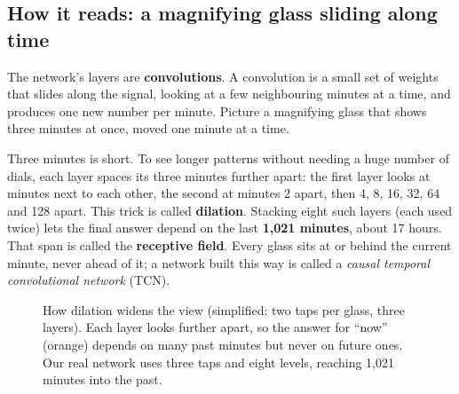 \subsection{How it reads: a magnifying glass sliding along time}
The network's layers are \textbf{convolutions}. A convolution is a small set of weights that slides along the
signal, looking at a few neighbouring minutes at a time, and produces one new number per minute. Picture a magnifying
glass that shows three minutes at once, moved one minute at a time.

Three minutes is short. To see longer patterns without needing a huge number of dials, each layer spaces its three
minutes further apart: the first layer looks at minutes next to each other, the second at minutes 2 apart, then 4, 8,
16, 32, 64 and 128 apart. This trick is called \textbf{dilation}. Stacking eight such layers (each used twice) lets the
final answer depend on the last \textbf{1{,}021 minutes}, about 17 hours. That span is called the
\textbf{receptive field}. Every glass sits at or behind the current minute, never ahead of it; a network built this way
is called a \emph{causal temporal convolutional network} (TCN).

\begin{figure}[h]
\centering
{}
\caption{How dilation widens the view (simplified: two taps per glass, three layers). Each layer looks further apart, so
the answer for ``now'' (orange) depends on many past minutes but never on future ones. Our real network uses three taps
and eight levels, reaching 1{,}021 minutes into the past.}
\label{fig:tcn}
\end{figure}

